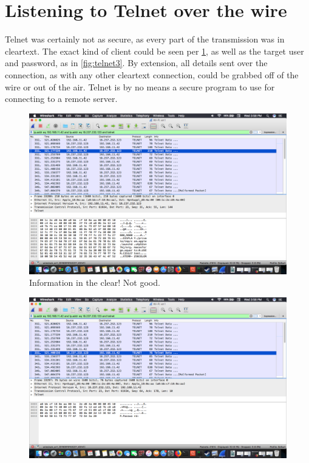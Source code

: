\documentclass{article}
\begin{document}
\section{Listening to Telnet over the wire}

Telnet was certainly not as secure, as every part of the transmission was in
cleartext. The exact kind of client could be seen per \ref{fig:telnet1}, as well as
the target user and password, as in \ref{fig:telnet3}. By extension, all details sent over the
connection, as with any other cleartext connection, could be grabbed off of the
wire or out of the air. Telnet is by no means a secure program to use for
connecting to a remote server.

\begin{figure}[h]
	\includegraphics[width=\linewidth]{telnet1.png}
	\caption{Information in the clear! Not good.}
	\label{fig:telnet1}
\end{figure}
\begin{figure}[h]
	\includegraphics[width=\linewidth]{telnet2.png}
	\caption{}
	\label{}
\end{figure}
\end{document}

